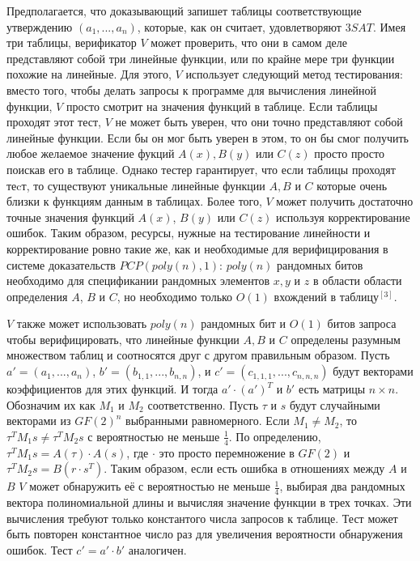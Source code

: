 \documentclass{article}
\newcommand{\blank} {
\newline
\newline
}
\theoremstyle{definition}
\begin{document}
Предполагается, что доказывающий запишет таблицы соответствующие утверждению $(a_1, ..., a_n) $, которые, как он считает, удовлетворяют $3SAT$. Имея три таблицы, верификатор $V$ может проверить, что они в самом деле представляют собой три линейные функции, или по крайне мере три функции похожие на линейные. Для этого, $V$  использует следующий метод тестирования: вместо того, чтобы делать запросы к программе для вычисления линейной функции, $V$ просто смотрит на значения функций в таблице. Если таблицы проходят этот тест, $V$ не может быть уверен, что они точно представляют собой линейные функции. Если бы он мог быть уверен в этом, то он бы смог получить любое желаемое значение фукций $A(x), B(y)$ или $C(z)$ просто просто поискав его в таблице. Однако тестер гарантирует, что если таблицы проходят теcт, то существуют уникальные линейные функции $A, B$ и $C$ которые очень близки к функциям данным в таблицах. Более того, $V$ может получить достаточно точные значения функций $A(x)$, $B(y)$ или $C(z)$ используя корректирование ошибок. Таким образом, ресурсы, нужные на тестирование линейности и корректирование ровно такие же, как и необходимые для верифицирования в системе доказательств $PCP(poly(n), 1)$: $poly(n)$ рандомных битов необходимо для спецификании рандомных элементов $x, y$ и $z$ в области области определения $A$, $B$ и $C$, но необходимо только $O(1)$ вхождений в таблицу$^{[3]}$.
\blank
$V$ также может использовать $poly(n)$ рандомных бит и $O(1)$ битов запроса чтобы верифицировать, что линейные функции $A, B$ и $C$ определены разумным множеством таблиц и соотносятся друг с другом правильным образом. Пусть $a' = (a_1, ..., a_n)$, $b' = (b_{1,1}, ..., b_{n,n})$, и $c' = (c_{1,1,1}, ..., c_{n,n,n})$ будут векторами коэффициентов для этих функций. И тогда $a' \cdot (a')^T$ и $b'$ есть матрицы $n \times n$. Обозначим их как $M_1$ и $M_2$ соответственно. Пусть $\tau$ и $s$ будут случайными векторами из $GF(2)^n$ выбранными равномерного. Если $M_1 \neq M_2$, то  $\tau^T M_1s \neq \tau^TM_2s$ с вероятностью не меньше $\frac{1}{4}$. По определению, $\tau^TM_1s = A(\tau) \cdot A(s)$, где $\cdot$ это просто перемножение в $GF(2)$ и $\tau^TM_2s = B(r \cdot s^T)$. Таким образом, если есть ошибка в отношениях между $A$ и $B$ $V$ может обнаружить её с вероятностью не меньше $\frac{1}{4}$, выбирая два рандомных вектора полиномиальной длины и вычисляя значение функции в трех точках. Эти вычисления требуют только константого числа запросов к таблице. Тест может быть повторен константное число раз для увеличения  вероятности обнаружения ошибок. Тест $c' = a'\cdot b'$ аналогичен.
\end{document}
